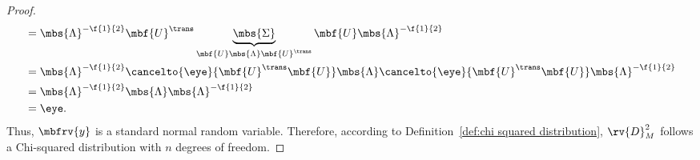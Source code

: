 \begin{proof}
\begin{align}
        &= \mbs{\Lambda}^{-\f{1}{2}}\mbf{U}^{\trans}\underbrace{\mbs{\Sigma}}_{\mbf{U}\mbs{\Lambda}\mbf{U}^{\trans}}\mbf{U}\mbs{\Lambda}^{-\f{1}{2}}\\
        &= \mbs{\Lambda}^{-\f{1}{2}}\cancelto{\eye}{\mbf{U}^{\trans}\mbf{U}}\mbs{\Lambda}\cancelto{\eye}{\mbf{U}^{\trans}\mbf{U}}\mbs{\Lambda}^{-\f{1}{2}}\\
        &= \mbs{\Lambda}^{-\f{1}{2}}\mbs{\Lambda}\mbs{\Lambda}^{-\f{1}{2}}\\
        &= \eye.
    \end{align}
    Thus, $\mbfrv{y}$ is a standard normal random variable. Therefore, according to Definition~\ref{def:chi squared distribution}, $\rv{D}_{M}^{2}$ follows a Chi-squared distribution with $n$ degrees of freedom.
\end{proof}
